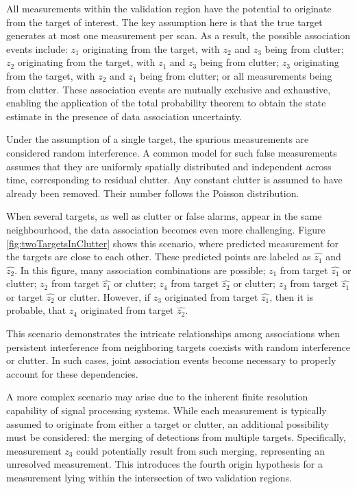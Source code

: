 All measurements within the validation region have the potential to originate from the target of interest. The key assumption
here is that the true
target generates
at most one
measurement
per scan. As a
result, the possible association events include: $z_1$ originating
from the target, with $z_2$ and $z_3$ being from clutter; $z_2$ originating from the target, with $z_1$ and $z_3$
being from clutter; $z_3$ originating from the target, with $z_2$ and $z_1$ being from clutter; or all measurements
being from clutter. These association events are mutually exclusive and exhaustive, enabling the application of the
total probability theorem to obtain the state estimate in the presence of data association uncertainty.

Under the assumption of a single target, the spurious measurements are considered random interference. A common model
for such false measurements assumes that they are uniformly spatially distributed and independent across time,
corresponding to residual clutter. Any constant clutter is assumed to have already been removed. Their number follows
the Poisson distribution.


When several targets, as well as clutter or false alarms, appear in the same neighbourhood, the data association becomes
even more challenging. Figure \ref{fig:twoTargetsInClutter} shows this scenario, where predicted measurement for the
targets are close to each other. These predicted points are labeled as $\hat{z_1}$ and $\hat{z_2}$. In this figure,
many association combinations are possible; $z_1$ from target $\hat{z_1}$ or clutter; $z_2$ from target $\hat{z_1}$
or clutter; $z_4$ from target $\hat{z_2}$ or clutter; $z_3$ from target $\hat{z_1}$ or target $\hat{z_2}$ or clutter. However, if $z_3$ originated from target $\hat{z_1}$, then it is probable, that $z_4$ originated from target $\hat{
    z_2}$.

This scenario demonstrates the intricate relationships among associations when persistent interference from neighboring targets coexists with random interference or clutter. In such cases, joint association events become necessary to properly account for these dependencies.

A more complex scenario may arise due to the inherent finite resolution capability of signal processing systems.
While each measurement is typically assumed to originate from either a target or clutter, an additional possibility
must be considered: the merging of detections from multiple targets. Specifically, measurement $z_3$ could
potentially result from such merging, representing an unresolved measurement. This introduces the fourth origin hypothesis for a measurement lying within the intersection of two validation regions.

